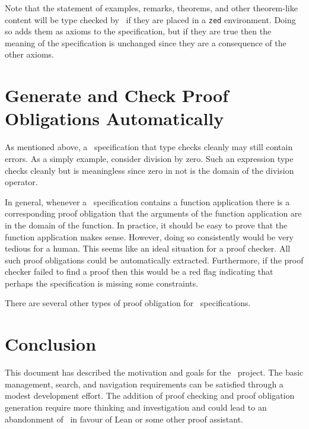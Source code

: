 \documentclass{amsart}
\begin{document}
 Note that the statement of examples, remarks, theorems, and other theorem-like content will be type checked by \fuzz\ if
 they are placed in a \texttt{zed} environment. 
 Doing so adds them as axioms to the specification, but if they are true then the meaning of the specification is unchanged
 since they are a consequence of the other axioms.
 
 \hypertarget{generate-and-check-proof-obligations-automatically}{}
 \section{Generate and Check Proof Obligations Automatically}
 
 As mentioned above, a \ZN\ specification that type checks cleanly may still contain errors.
 As a simply example, consider division by zero. 
 Such an expression type checks cleanly but is meaningless since zero in not is the domain of the division operator.
 
 In general, whenever a \ZN\ specification contains a function application there is a corresponding proof obligation
 that the arguments of the function application are in the domain of the function.
 In practice, it should be easy to prove that the function application makes sense.
 However, doing so consistently would be very tedious for a human.
 This seems like an ideal situation for a proof checker.
 All such proof obligations could be automatically extracted.
 Furthermore, if the proof checker failed to find a proof then this would be a red flag indicating that perhaps the specification
 is missing some constraints.
 
 There are several other types of proof obligation for \ZN\ specifications.
 
 \section{Conclusion}
 
 This document has described the motivation and goals for the \mathz\ project.
 The basic management, search, and navigation requirements can be satisfied through a modest development effort.
 The addition of proof checking and proof obligation generation require more thinking and investigation and could
 lead to an abandonment of \ZN\ in favour of Lean or some other proof assistant.
 
 \printbibliography
\end{document}
